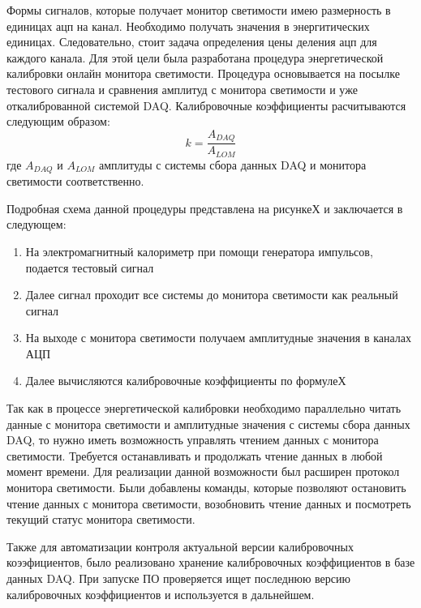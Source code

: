   Формы сигналов, которые получает монитор светимости имею размерность в единицах ацп на канал. Необходимо получать значения в энергитических единицах. Следовательно, стоит задача определения цены деления ацп для каждого канала. Для этой цели была разработана процедура энергетической калибровки онлайн монитора светимости. Процедура основывается на посылке тестового сигнала и сравнения амплитуд с монитора светимости и уже откалиброванной системой DAQ. Калибровочные коэффициенты расчитываются следующим образом:
\begin{equation}
  k = \frac{A_{DAQ}}{A_{LOM}}
\end{equation}
 где $A_{DAQ}$ и $A_{LOM}$ амплитуды с системы сбора данных DAQ и монитора светимости соответственно.\par
  Подробная схема данной процедуры представлена на рисункеХ и заключается в следующем:
\begin{enumerate}
  \item На электромагнитный калориметр при помощи генератора импульсов, подается тестовый сигнал
  \item Далее сигнал проходит все системы до монитора светимости как реальный сигнал
  \item На выходе с монитора светимости получаем амплитудные значения в каналах АЦП
  \item Далее вычисляются калибровочные коэффициенты по формулеХ
\end{enumerate}\par
  Так как в процессе энергетической калибровки необходимо параллельно читать данные с монитора светимости и амплитудные значения с системы сбора данных DAQ, то нужно иметь возможность управлять чтением данных с монитора светимости. Требуется останавливать и продолжать чтение данных в любой момент времени. Для реализации данной возможности был расширен протокол монитора светимости. Были добавлены команды, которые позволяют остановить чтение данных с монитора светимости, возобновить чтение данных и посмотреть текущий статус монитора светимости.\par
  Также для автоматизации контроля актуальной версии калибровочных коээфициентов, было реализовано хранение калибровочных коэффициентов в базе данных DAQ. При запуске ПО  проверяется ищет последнюю версию калибровочных коэффициентов и используется в дальнейшем.\par
